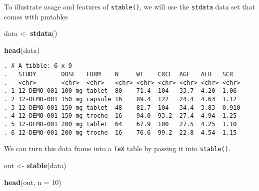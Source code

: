 \documentclass[
]{book}
\newenvironment{Shaded}{\begin{snugshade}}{\end{snugshade}}
\newcommand{\DataTypeTok}[1]{\textcolor[rgb]{0.13,0.29,0.53}{#1}}
\newcommand{\DecValTok}[1]{\textcolor[rgb]{0.00,0.00,0.81}{#1}}
\newcommand{\KeywordTok}[1]{\textcolor[rgb]{0.13,0.29,0.53}{\textbf{#1}}}
\newcommand{\NormalTok}[1]{#1}
\newcommand{\StringTok}[1]{\textcolor[rgb]{0.31,0.60,0.02}{#1}}
\begin{document}
To illustrate usage and features of \texttt{stable()}, we will use the \texttt{stdata}
data set that comes with pmtables

\begin{Shaded}
\begin{Highlighting}[]
\NormalTok{data <-}\StringTok{ }\KeywordTok{stdata}\NormalTok{()}

\KeywordTok{head}\NormalTok{(data)}
\end{Highlighting}
\end{Shaded}

\begin{verbatim}
. # A tibble: 6 x 9
.   STUDY       DOSE   FORM    N     WT    CRCL  AGE   ALB   SCR  
.   <chr>       <chr>  <chr>   <chr> <chr> <chr> <chr> <chr> <chr>
. 1 12-DEMO-001 100 mg tablet  80    71.4  104   33.7  4.20  1.06 
. 2 12-DEMO-001 150 mg capsule 16    89.4  122   24.4  4.63  1.12 
. 3 12-DEMO-001 150 mg tablet  48    81.7  104   34.4  3.83  0.910
. 4 12-DEMO-001 150 mg troche  16    94.0  93.2  27.4  4.94  1.25 
. 5 12-DEMO-001 200 mg tablet  64    67.9  100   27.5  4.25  1.10 
. 6 12-DEMO-001 200 mg troche  16    76.6  99.2  22.8  4.54  1.15
\end{verbatim}

We can turn this data frame into a \texttt{TeX} table by passing it into \texttt{stable()}.

\begin{Shaded}
\begin{Highlighting}[]
\NormalTok{out <-}\StringTok{ }\KeywordTok{stable}\NormalTok{(data)}

\KeywordTok{head}\NormalTok{(out, }\DataTypeTok{n =} \DecValTok{10}\NormalTok{)}
\end{Highlighting}
\end{Shaded}
\end{document}
